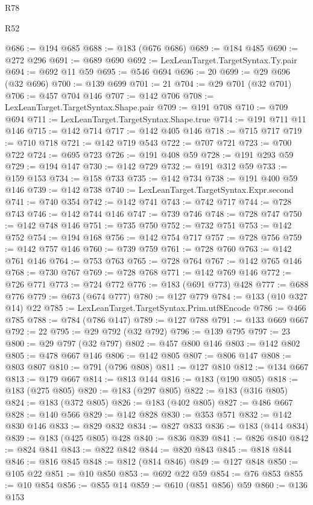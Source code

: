 \begin{lexlean}{R78}
\begin{lexlean}{R52}
\begin{coremodule}
{{{{{{{{{{{{{{{{{{{{{{{{{{{{{{{{{{{{{{{{{{{{{{{{{{{{{{{{{{{{{{{{{{{{{{{{{{{{{{{{{{{{{{{{{{{{{{{{{{{{{{{{{{{{{{{{{{{{{{{{{{{{{{{{{{{{{{{{{{{{{{{{{{{{{{{{{{{{{{{{{{{{{{{{{{{{{{{{{{{{{{{{{{{{{{{{{{{{{{@686 := @194 @685
@688 := @183 (@676 @686)
@689 := @184 @485
@690 := @272 @296
@691 := @689 @690
@692 := LexLeanTarget.TargetSyntax.Ty.pair
@694 := @692 @11 @59
@695 := @546 @694
@696 := 20
@699 := @29 @696 (@32 @696)
@700 := @139 @699
@701 := 21
@704 := @29 @701 (@32 @701)
@706 := @457 @704 @146
@707 := @142 @706
@708 := LexLeanTarget.TargetSyntax.Shape.pair
@709 := @191 @708
@710 := @709 @694
@711 := LexLeanTarget.TargetSyntax.Shape.true
@714 := @191 @711 @11 @146
@715 := @142 @714
@717 := @142 @405 @146
@718 := @715 @717
@719 := @710 @718
@721 := @142 @719 @543
@722 := @707 @721
@723 := @700 @722
@724 := @695 @723
@726 := @191 @408 @59
@728 := @191 @293 @59
@729 := @194 @147
@730 := @142 @729
@732 := @191 @312 @59
@733 := @159 @153
@734 := @158 @733
@735 := @142 @734
@738 := @191 @400 @59 @146
@739 := @142 @738
@740 := LexLeanTarget.TargetSyntax.Expr.second
@741 := @740 @354
@742 := @142 @741
@743 := @742 @717
@744 := @728 @743
@746 := @142 @744 @146
@747 := @739 @746
@748 := @728 @747
@750 := @142 @748 @146
@751 := @735 @750
@752 := @732 @751
@753 := @142 @752
@754 := @194 @168
@756 := @142 @754 @717
@757 := @728 @756
@759 := @142 @757 @146
@760 := @739 @759
@761 := @728 @760
@763 := @142 @761 @146
@764 := @753 @763
@765 := @728 @764
@767 := @142 @765 @146
@768 := @730 @767
@769 := @728 @768
@771 := @142 @769 @146
@772 := @726 @771
@773 := @724 @772
@776 := @183 (@691 @773) @428
@777 := @688 @776
@779 := @673 (@674 @777)
@780 := @127 @779
@784 := @133 (@10 @327 @14) @22
@785 := LexLeanTarget.TargetSyntax.Prim.utf8Encode
@786 := @466 @785
@788 := @784 (@786 @147)
@789 := @127 @788
@791 := @133 @669 @667
@792 := 22
@795 := @29 @792 (@32 @792)
@796 := @139 @795
@797 := 23
@800 := @29 @797 (@32 @797)
@802 := @457 @800 @146
@803 := @142 @802
@805 := @478 @667 @146
@806 := @142 @805
@807 := @806 @147
@808 := @803 @807
@810 := @791 (@796 @808)
@811 := @127 @810
@812 := @134 @667
@813 := @179 @667
@814 := @813 @144
@816 := @183 (@190 @805)
@818 := @183 (@275 @805)
@820 := @183 (@297 @805)
@822 := @183 (@316 @805)
@824 := @183 (@372 @805)
@826 := @183 (@402 @805)
@827 := @486 @667
@828 := @140 @566
@829 := @142 @828
@830 := @353 @571
@832 := @142 @830 @146
@833 := @829 @832
@834 := @827 @833
@836 := @183 (@414 @834)
@839 := @183 (@425 @805) @428
@840 := @836 @839
@841 := @826 @840
@842 := @824 @841
@843 := @822 @842
@844 := @820 @843
@845 := @818 @844
@846 := @816 @845
@848 := @812 (@814 @846)
@849 := @127 @848
@850 := @105 @22
@851 := @10 @850
@853 := @692 @22 @59
@854 := @76 @853
@855 := @10 @854
@856 := @855 @14
@859 := @610 (@851 @856) @59
@860 := @136 @153
}}}}}}}}}}}}}}}}}}}}}}}}}}}}}}}}}}}}}}}}}}}}}}}}}}}}}}}}}}}}}}}}}}}}}}}}}}}}}}}}}}}}}}}}}}}}}}}}}}}}}}}}}}}}}}}}}}}}}}}}}}}}}}}}}}}}}}}}}}}}}}}}}}}}}}}}}}}}}}}}}}}}}}}}}}}}}}}}}}}}}}}}}}}}}}}}}}}}}}
\end{coremodule}
\end{lexlean}
\end{lexlean}
